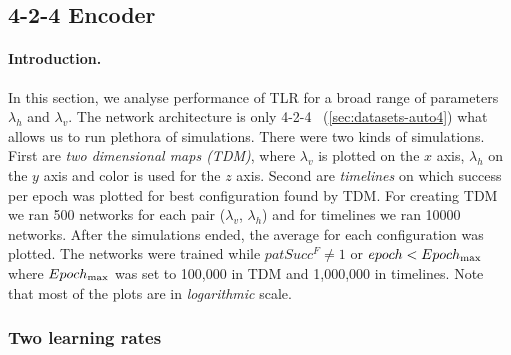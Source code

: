 

\subsection{4-2-4 Encoder} 
\label{sec:results-auto4} 

\paragraph{Introduction.} 
\label{sec:results-auto4-introduction} 
In this section, we analyse performance of TLR for a broad range of parameters $\lambda_h$ and $\lambda_v$. The network architecture is only 4-2-4~
(\ref{sec:datasets-auto4}) what allows us to run plethora of simulations. There were two kinds of simulations. First are \emph{two dimensional maps (TDM)}, where $\lambda_v$ is plotted on the $x$ axis, $\lambda_h$ on the $y$ axis and color is used for the $z$ axis. Second are \emph{timelines}  on which success per epoch was plotted for best configuration found by TDM. For creating TDM we ran 500 networks for each pair ($\lambda_v$, $\lambda_h$) and for timelines we ran 10000 networks. After the simulations ended, the average for each configuration was plotted. The networks were trained while $patSucc^F \neq 1$ or $epoch < Epoch_{\rm max}$ where $Epoch_{\rm max}$ was set to 100,000 in TDM and 1,000,000 in timelines. Note that most of the plots are in \emph{logarithmic} scale. 

 

\subsubsection{Two learning rates} 
\label{sec:tlr-auto4}

